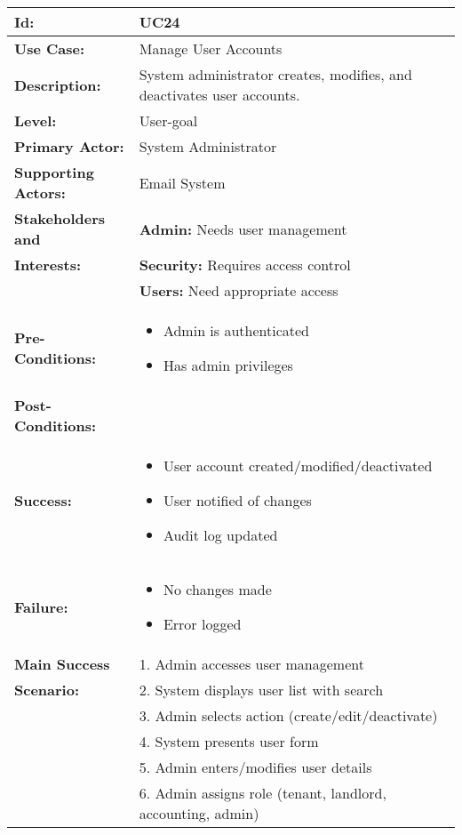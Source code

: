 \documentclass[12pt]{article}
\begin{document}
\begin{longtable}{|p{3cm}|p{11cm}|}
\hline
\textbf{Id:} & UC24 \\
\hline
\textbf{Use Case:} & Manage User Accounts \\
\hline
\textbf{Description:} & System administrator creates, modifies, and deactivates user accounts. \\
\hline
\textbf{Level:} & User-goal \\
\hline
\textbf{Primary Actor:} & System Administrator \\
\hline
\textbf{Supporting Actors:} & Email System \\
\hline
\textbf{Stakeholders and} & \textbf{Admin:} Needs user management \\
\textbf{Interests:} & \textbf{Security:} Requires access control \\
& \textbf{Users:} Need appropriate access \\
\hline
\textbf{Pre-Conditions:} & 
\begin{itemize}
    \item Admin is authenticated
    \item Has admin privileges
\end{itemize} \\
\hline
\textbf{Post-Conditions:} & \\
\textbf{Success:} & 
\begin{itemize}
    \item User account created/modified/deactivated
    \item User notified of changes
    \item Audit log updated
\end{itemize} \\
\textbf{Failure:} & 
\begin{itemize}
    \item No changes made
    \item Error logged
\end{itemize} \\
\hline
\textbf{Main Success} & 1. Admin accesses user management \\
\textbf{Scenario:} & 2. System displays user list with search \\
& 3. Admin selects action (create/edit/deactivate) \\
& 4. System presents user form \\
& 5. Admin enters/modifies user details \\
& 6. Admin assigns role (tenant, landlord, accounting, admin) \\

\end{longtable}
\end{document}

